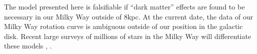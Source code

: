 \documentclass[reprint,%
 amsmath,amssymb,
 aps,
]{revtex4-1}
\begin{document}
  The model presented here  is falsifiable if ``dark matter'' effects are   found to be necessary in our Milky Way outside of 8kpc. At the current date, the data of our Milky Way rotation curve is ambiguous outside of our position in the galactic disk.   Recent large surveys of millions of  stars in the Milky Way will differentiate these models   \cite{2022ApJS..259...35A}, \cite{2010ApJ...716....1B}.
  
  
     
     
      
   

%
\end{document}
